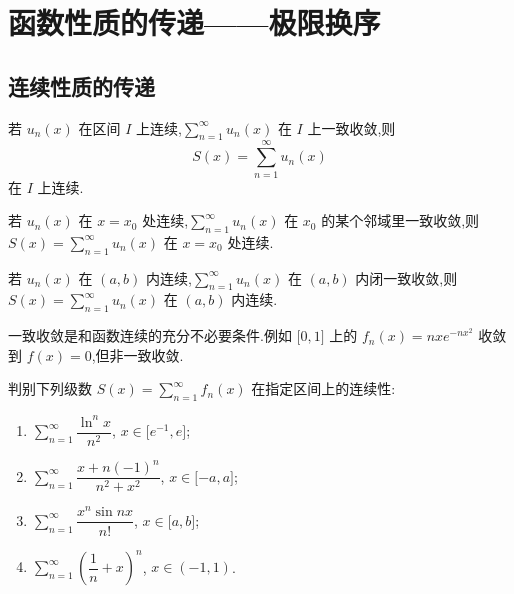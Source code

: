 \newpage

\section{函数性质的传递——极限换序}


\subsection{连续性质的传递}

\begin{theorem}[\markstar]
    若 $u_n(x)$ 在区间 $I$ 上连续,$\displaystyle\sum\limits_{n=1}^{\infty}u_n(x)$ 在 $I$ 上一致收敛,则
    \[
        S(x)=\sum\limits_{n=1}^{\infty}u_n(x)
    \]
    在 $I$ 上连续.
\end{theorem}

\begin{theorem}[\markstar]
    若 $u_n(x)$ 在 $x=x_0$ 处连续,$\displaystyle\sum\limits_{n=1}^{\infty}u_n(x)$ 在 $x_0$ 的某个邻域里一致收敛,则 $S(x)=\displaystyle\sum\limits_{n=1}^{\infty}u_n(x)$ 在 $x=x_0$ 处连续.
\end{theorem}

\begin{theorem}[\markstar]
    若 $u_n(x)$ 在 $(a,b)$ 内连续,$\displaystyle\sum\limits_{n=1}^{\infty}u_n(x)$ 在 $(a,b)$ 内闭一致收敛,则 $S(x)=\displaystyle\sum\limits_{n=1}^{\infty}u_n(x)$ 在 $(a,b)$ 内连续.
\end{theorem}

\begin{remark}
    一致收敛是和函数连续的充分不必要条件.例如 $\lbrack 0,1\rbrack$ 上的 $f_n(x)=nxe^{-nx^2}$ 收敛到 $f(x)=0$,但非一致收敛.
\end{remark}

\begin{example}
    判别下列级数 $\displaystyle S(x)=\sum\limits_{n=1}^{\infty}f_n(x)$ 在指定区间上的连续性:
    \begin{enumerate}
        \item $\displaystyle\sum\limits_{n=1}^{\infty}\dfrac{\ln^n x}{n^2}$, $x\in\lbrack e^{-1},e\rbrack$;
        \item $\displaystyle\sum\limits_{n=1}^{\infty}\dfrac{x+n(-1)^n}{n^2+x^2}$, $x\in\lbrack -a,a\rbrack$;
        \item $\displaystyle\sum\limits_{n=1}^{\infty}\dfrac{x^n\sin nx}{n!}$, $x\in\lbrack a,b\rbrack$;
        \item $\displaystyle\sum\limits_{n=1}^{\infty}\left(\dfrac{1}{n}+x\right)^n$, $x\in(-1,1)$.
    \end{enumerate}
\end{example}
\exampleblank

